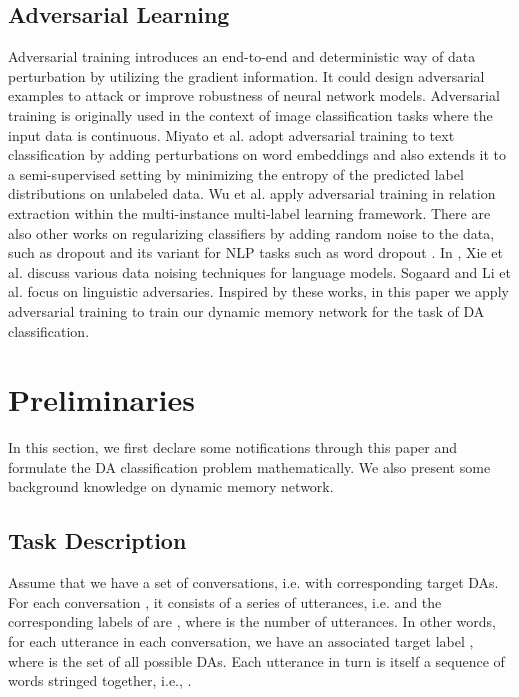 \documentclass[conference]{IEEEtran}
\begin{document}
	\subsection{Adversarial Learning}
Adversarial training \cite{goodfellow2015explaining} introduces an end-to-end and deterministic way of data perturbation by utilizing the gradient information. It could design adversarial examples to attack \cite{tramer2017ensemble} or improve robustness \cite{ wang2018not, zhang2018layerwise} of neural network models. Adversarial training is originally used in the context of image classiﬁcation tasks where the input data is continuous. Miyato et al. \cite{miyato2016adversarial} adopt adversarial training to text classiﬁcation by adding perturbations on word embeddings and also extends it to a semi-supervised setting by minimizing the entropy of the predicted label distributions on unlabeled data. Wu et al. \cite{wu2017adversarial} apply adversarial training in relation extraction within the multi-instance multi-label learning framework. There are also other works on regularizing classifiers by adding random noise to the data, such as dropout \cite{srivastava2014dropout} and its variant for NLP tasks such as word dropout \cite{iyyer2015deep}. In \cite{xie2017data}, Xie et al. discuss various data noising techniques for language models. Sogaard and Li et al. \cite{li2017robust} focus on linguistic adversaries. Inspired by these works, in this paper we apply adversarial training to train our dynamic memory network for the task of DA classification. 

	\section{Preliminaries}\label{sec_preliminaries}
	In this section, we first declare some notifications through this paper and formulate the DA classification problem mathematically. We also present some background knowledge on dynamic memory network.
	
	\subsection{Task Description}
	Assume that we have a set  of  conversations, i.e.  with  corresponding target DAs. For each conversation , it consists of a series of utterances, i.e.  and the corresponding labels of  are , where  is the number of utterances. In other words, for each utterance  in each conversation, we have an associated target label , where  is the set of all possible DAs. Each utterance  in turn is itself a sequence of  words stringed together, i.e., .
	
\end{document}
